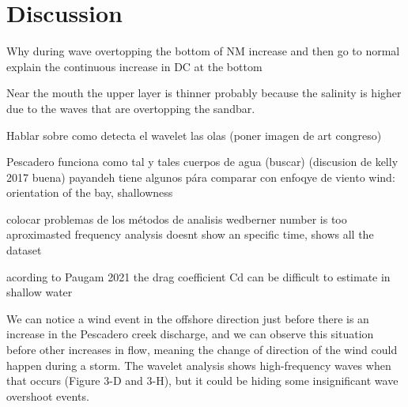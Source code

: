 \documentclass[tesis.tex]{subfiles}
\begin{document}
    
\section{Discussion}


Why during wave overtopping the bottom of NM increase and then go to normal
explain the  continuous increase in DC at the bottom

Near the mouth the upper layer is thinner probably because the salinity is higher due to the waves that are overtopping the sandbar.

Hablar sobre como detecta el wavelet las olas (poner imagen de art congreso)

Pescadero funciona como tal y tales cuerpos de agua (buscar) (discusion de kelly 2017 buena)
payandeh tiene algunos pára comparar con enfoqye de viento
wind: orientation of the bay, shallowness

colocar problemas de los métodos de analisis
wedberner number is too aproximasted
frequency analysis doesnt show an specific time, shows all the dataset

acording to Paugam 2021 the drag coefficient Cd can be difficult to estimate in shallow water %

We can notice a wind event in the offshore direction just before there is an increase in the Pescadero creek discharge, and we can observe this situation before other increases in flow, meaning the change of direction of the wind could happen during a storm.
The wavelet analysis shows high-frequency waves when that occurs (Figure 3-D and 3-H), but it could be hiding some insignificant wave overshoot events.
\end{document}
